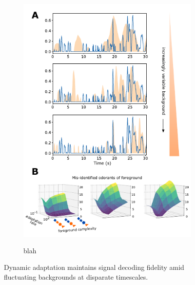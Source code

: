 


\begin{figure}
	\begin{subfigure}[t]{\linewidth}
		{\includegraphics[width=\textwidth]{figures/Figures_temporal_coding_2}}
		\caption{blah}
		\label{fig:temporal_coding_2_a}	
	\end{subfigure}
	\begin{subfigure}[t]{0\linewidth}
		\label{fig:temporal_coding_2_b}
	\end{subfigure}
	\begin{subfigure}[t]{0\linewidth}
		\label{fig:temporal_coding_2_c}
	\end{subfigure}
	\caption{Dynamic adaptation maintains signal decoding fidelity amid fluctuating backgrounds at disparate timescales.}
	\label{temporal_coding_2}
\end{figure}


